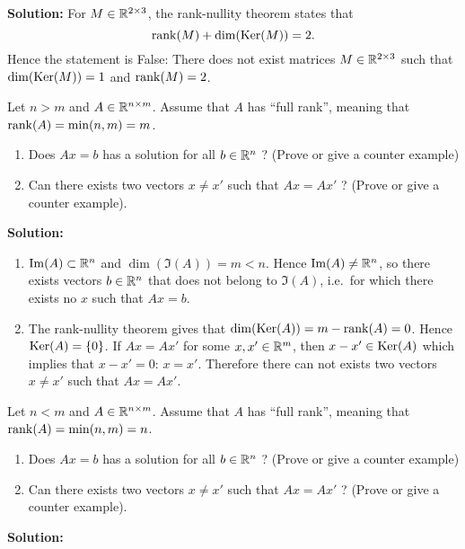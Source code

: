 \documentclass[11pt,nocut]{article}
\begin{document}
\textbf{Solution:}
For $M \in \mathbb{R}^{2 \times 3}$, the rank-nullity theorem states that
$$
{{\rm rank}}(M) + {{\rm dim}}({{\rm Ker}}(M)) = 2.
$$
Hence the statement is False:
There does not exist matrices $M \in \mathbb{R}^{2 \times 3}$ such that ${{\rm dim}}({{\rm Ker}}(M))=1$ and ${{\rm rank}}(M)=2$.

\vspace{0.2cm}

\begin{problem}
	Let $n>m$ and $A \in \mathbb{R}^{n \times m}$. Assume that $A$ has ``full rank'', meaning that ${{\rm rank}}(A)=\min(n,m)=m$.
	\begin{enumerate}
		\item Does $Ax=b$ has a solution for all $b \in \mathbb{R}^n$ ? (Prove or give a counter example)
		\item Can there exists two vectors $x \neq x'$ such that $Ax=Ax'$ ? (Prove or give a counter example).
	\end{enumerate}
\end{problem}

\textbf{Solution:}

	\begin{enumerate}
		\item ${{\rm Im}}(A) \subset \mathbb{R}^n$ and $\dim(\Im(A)) = m < n$. Hence ${{\rm Im}}(A) \neq \mathbb{R}^n$, so there exists vectors $b \in \mathbb{R}^n$ that does not belong to $\Im(A)$, i.e.\ for which there exists no $x$ such that $Ax=b$.
		\item The rank-nullity theorem gives that ${{\rm dim}}({{\rm Ker}}(A)) = m - {{\rm rank}}(A) = 0$. Hence ${{\rm Ker}}(A) = \{0\}$. If $Ax = Ax'$ for some $x,x' \in \mathbb{R}^m$, then $x-x' \in {{\rm Ker}}(A)$ which implies that $x-x' = 0$: $x=x'$.
		Therefore there can not exists two vectors $x \neq x'$ such that $Ax=Ax'$.
	\end{enumerate}

\vspace{0.2cm}

\begin{problem}
	Let $n<m$ and $A \in \mathbb{R}^{n \times m}$. Assume that $A$ has ``full rank'', meaning that ${{\rm rank}}(A)=\min(n,m)=n$.
	\begin{enumerate}
		\item Does $Ax=b$ has a solution for all $b \in \mathbb{R}^n$ ? (Prove or give a counter example)
		\item Can there exists two vectors $x \neq x'$ such that $Ax=Ax'$ ? (Prove or give a counter example).
	\end{enumerate}
\end{problem}

\textbf{Solution:}
\end{document}
